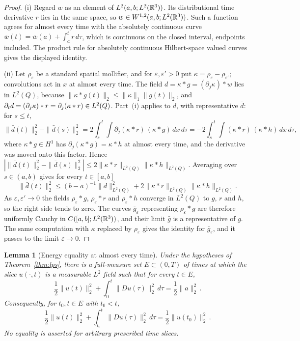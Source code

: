 \documentclass[11pt,letterpaper]{article}
\numberwithin{equation}{section}
\theoremstyle{plain}
\newtheorem{lemma}[theorem]{Lemma}
\theoremstyle{definition}
\theoremstyle{remark}
\begin{document}
\begin{proof}
(i) Regard $w$ as an element of $L^2(a,b;L^2(\mathbb{R}^3))$. Its distributional
time derivative $r$ lies in the same space, so
$w\in W^{1,2}(a,b;L^2(\mathbb{R}^3))$. Such a function agrees for almost every
time with the absolutely continuous curve
$\bar w(t)=\bar w(a)+\int_a^tr\,d\tau$, which is continuous on the closed
interval, endpoints included. The product rule for absolutely continuous
Hilbert-space valued curves gives the displayed identity.

(ii) Let $\rho_\varepsilon$ be a standard spatial mollifier, and for
$\varepsilon,\varepsilon'>0$ put $\kappa=\rho_\varepsilon-\rho_{\varepsilon'}$;
convolutions act in $x$ at almost every time. The field
$d=\kappa*g=(\partial_j\kappa)*w$ lies in $L^2(Q)$, because
$\|\kappa*g(t)\|_2\le\|\kappa\|_1\|g(t)\|_2$, and
$\partial_t d=(\partial_j\kappa)*r=\partial_j(\kappa*r)\in L^2(Q)$. Part~(i)
applies to $d$, with representative $\bar d$: for $s\le t$,
\[
\|\bar d(t)\|_2^2-\|\bar d(s)\|_2^2
=2\int_s^t\!\!\int\partial_j(\kappa*r)\,(\kappa*g)\,dx\,d\tau
=-2\int_s^t\!\!\int(\kappa*r)\,(\kappa*h)\,dx\,d\tau ,
\]
where $\kappa*g\in H^1$ has $\partial_j(\kappa*g)=\kappa*h$ at almost every
time, and the derivative was moved onto this factor. Hence
$|\|\bar d(t)\|_2^2-\|\bar d(s)\|_2^2|\le2\|\kappa*r\|_{L^2(Q)}\|\kappa*h\|_{L^2(Q)}$.
Averaging over $s\in(a,b)$ gives for every $t\in[a,b]$
\[
\|\bar d(t)\|_2^2\le(b-a)^{-1}\|d\|_{L^2(Q)}^2
+2\|\kappa*r\|_{L^2(Q)}\|\kappa*h\|_{L^2(Q)} .
\]
As $\varepsilon,\varepsilon'\to0$ the fields $\rho_\varepsilon*g$,
$\rho_\varepsilon*r$ and $\rho_\varepsilon*h$ converge in $L^2(Q)$ to $g$, $r$
and $h$, so the right side tends to zero. The curves $\bar g_\varepsilon$
representing $\rho_\varepsilon*g$ are therefore uniformly Cauchy in
$C([a,b];L^2(\mathbb{R}^3))$, and their limit $\bar g$ is a representative of $g$.
The same computation with $\kappa$ replaced by $\rho_\varepsilon$ gives the
identity for $\bar g_\varepsilon$, and it passes to the limit
$\varepsilon\to0$.
\end{proof}

\begin{lemma}[Energy equality at almost every time]\label{lem:lps-energy-equality}
Under the hypotheses of Theorem~\ref{thm:lps}, there is a full-measure
set $E\subset(0,T)$ of times at which the slice $u(\cdot,t)$ is a
measurable $L^2$ field such that for every $t\in E$,
\begin{equation}\label{eq:lps-energy-equality}
\frac12\|u(t)\|_2^2+
\int_0^t\|Du(\tau)\|_2^2\,d\tau
=\frac12\|a\|_2^2\,.
\end{equation}
Consequently, for $t_0,t\in E$ with $t_0<t$,
\begin{equation}\label{eq:lps-energy-restart}
\frac12\|u(t)\|_2^2+
\int_{t_0}^t\|Du(\tau)\|_2^2\,d\tau
=\frac12\|u(t_0)\|_2^2\,.
\end{equation}
No equality is asserted for arbitrary prescribed time slices.
\end{lemma}
\end{document}
